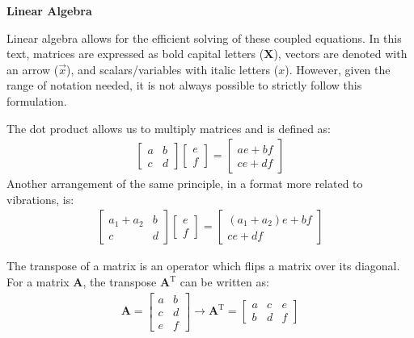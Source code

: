 \documentclass[12pt,letter]{article}
\begin{document}
	
	\begin{review}
	\textbf{Linear Algebra}
	
	\noindent Linear algebra allows for the efficient solving of these coupled equations. In this text, matrices are expressed as bold capital letters ($\textbf{X}$), vectors are denoted with an arrow ($\vec{x}$), and scalars/variables with italic letters ($x$). However, given the range of notation needed, it is not always possible to strictly follow this formulation.
	
	The dot product allows us to multiply matrices and is defined as:
	\begin{eqnarray}
	  \begin{bmatrix} a & b \\ c & d \end{bmatrix}\begin{bmatrix} e \\  f \end{bmatrix} = \begin{bmatrix} ae+bf \\ ce + df \end{bmatrix}
	\end{eqnarray}
	Another arrangement of the same principle, in a format more related to vibrations, is:
	\begin{eqnarray}
	  \begin{bmatrix} a_1+a_2 & b \\ c & d \end{bmatrix}\begin{bmatrix} e \\  f \end{bmatrix} = \begin{bmatrix} (a_1+a_2)e+bf \\ ce + df \end{bmatrix}
	\end{eqnarray}
	
	The transpose of a matrix is an operator which flips a matrix over its diagonal. For a matrix $\textbf{A}$, the transpose $\textbf{A}^\text{T}$ can be written as:
	\begin{eqnarray}
	   \textbf{A} = \begin{bmatrix} a & b \\ c & d \\ e & f\end{bmatrix} \rightarrow \textbf{A}^\text{T} = \begin{bmatrix} a & c & e \\  b & d & f \end{bmatrix}
	\end{eqnarray}
	

\end{review}
\end{document}
